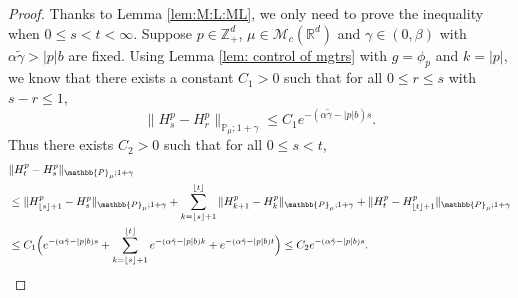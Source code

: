 \documentclass[EJP]{ejpecp} %
\begin{document}
\begin{proof}
	Thanks to Lemma \ref{lem:M:L:ML}, we only  need to prove the inequality  when $0\leq s < t<\infty$.
	Suppose $p\in \mathbb{Z}_+^d$, $\mu\in \mathcal M_c(\mathbb R^d)$ and  $\gamma \in (0,\beta)$ with $\alpha \tilde \gamma > |p|b$ are fixed.
	Using Lemma \ref{lem: control of mgtrs} with $g=\phi_p$ and $k=|p|$,  we know that there exists a constant $C_1>0$ such that for all $0\leq r\leq s $ with $s-r\leq1$,
\[
    \|H^p_s-H^p_r\|_{\mathbb P_\mu; 1+\gamma}
    \leq  C_1 e^{-(\alpha\tilde \gamma-|p|b)s}.
\]
	Thus there exists $C_2>0$ such that for all $0\leq s<t$,
\begin{align}
    & \|H^p_t-H^p_s\|_{\mathbb{P}_{\mu};1+\gamma} \\
    & \leq \|H^p_{\lfloor s \rfloor+1}-H^p_s\|_{\mathbb{P}_{\mu};1+\gamma}+\sum_{k=\lfloor s \rfloor+1}^{\lfloor t \rfloor}\|H^p_{k+1}-H^p_{k}\|_{\mathbb{P}_{\mu};1+\gamma}+\|H^p_t-H^p_{\lfloor t \rfloor+1}\|_{\mathbb{P}_{\mu};1+\gamma} \\
    & \leq C_1 \Big(e^{-(\alpha \tilde \gamma- |p|b) s}+\sum_{k=\lfloor s \rfloor+1}^{\lfloor t \rfloor} e^{-(\alpha \tilde \gamma- |p|b) k} + e^{-(\alpha \tilde \gamma-|p|b) t}\Big)
    \leq C_2e^{-(\alpha \tilde \gamma-|p|b)s}.
   	\qedhere
\end{align}	
\end{proof}
\end{document}
